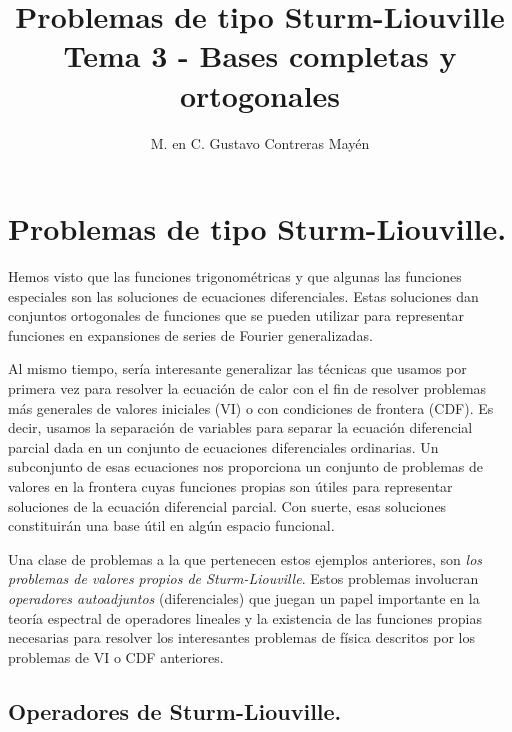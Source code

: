
\title{Problemas de tipo Sturm-Liouville \\ \large {Tema 3 - Bases completas y ortogonales}\vspace{-3ex}}

\author{M. en C. Gustavo Contreras Mayén}
\date{ }

\pagestyle{fancy}
\fancyhf{}
\lhead{\leftmark}
\rfoot{\thepage}
\setlength{\headheight}{16pt}%



\maketitle
\fontsize{14}{14}\selectfont
\tableofcontents
\newpage

\section{Problemas de tipo Sturm-Liouville.}

Hemos visto que las funciones trigonométricas y que algunas las funciones especiales son las soluciones de ecuaciones diferenciales. Estas soluciones dan conjuntos ortogonales de funciones que se pueden utilizar para representar funciones en expansiones de series de Fourier generalizadas.
\par
Al mismo tiempo, sería interesante generalizar las técnicas que usamos por primera vez para resolver la ecuación de calor con el fin de resolver problemas más generales de valores iniciales (VI) o con condiciones de frontera (CDF). Es decir, usamos la separación de variables para separar la ecuación diferencial parcial dada en un conjunto de ecuaciones diferenciales ordinarias. Un subconjunto de esas ecuaciones nos proporciona un conjunto de problemas de valores en la frontera cuyas funciones propias son útiles para representar soluciones de la ecuación diferencial parcial. Con suerte, esas soluciones constituirán una base útil en algún espacio funcional.
\par
Una clase de problemas a la que pertenecen estos ejemplos anteriores, son \emph{los problemas de valores propios de Sturm-Liouville}. Estos problemas involucran \emph{operadores autoadjuntos} (diferenciales) que juegan un papel importante en la teoría espectral de operadores lineales y la existencia de las funciones propias necesarias para resolver los interesantes problemas de física descritos por los problemas de VI o CDF anteriores.

\subsection{Operadores de Sturm-Liouville.}

